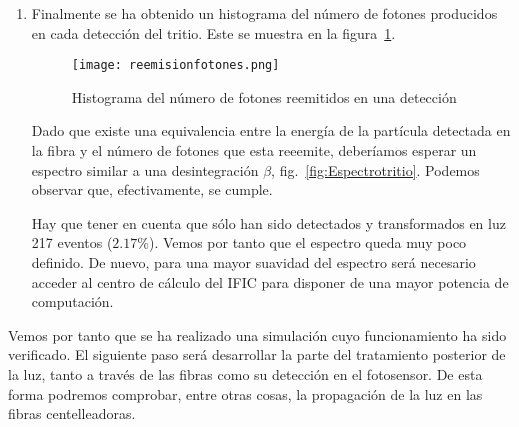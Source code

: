 \begin{enumerate}
\item{} Finalmente se ha obtenido un histograma del número de fotones producidos en cada detección del tritio. Este se muestra en la figura~\ref{reemision}.

\begin{figure}[hbtp]
\centering
\texttt{[image: reemisionfotones.png]}
\caption{Histograma del número de fotones reemitidos en una detección \label{reemision}}
\end{figure}

Dado que existe una equivalencia entre la energía de la partícula detectada en la fibra y el número de fotones que esta reeemite, deberíamos esperar un espectro similar a una desintegración $\beta$, fig.~\ref{fig:Espectrotritio}. Podemos observar que, efectivamente, se cumple.

Hay que tener en cuenta que sólo han sido detectados y transformados en luz 217 eventos ($2.17\%$). Vemos por tanto que el espectro queda muy poco definido. De nuevo, para una mayor suavidad del espectro será necesario acceder al centro de cálculo del IFIC para disponer de una mayor potencia de computación.
\end{enumerate}

Vemos por tanto que se ha realizado una simulación cuyo funcionamiento ha sido verificado. El siguiente paso será desarrollar la parte del tratamiento posterior de la luz, tanto a través de las fibras como su detección en el fotosensor. De esta forma podremos comprobar, entre otras cosas, la propagación de la luz en las fibras centelleadoras.
